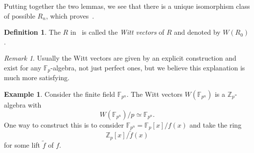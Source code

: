 \documentclass[10pt, oneside]{memoir}
\theoremstyle{definition}
\newtheorem{defn}[thm]{Definition}
\newtheorem{exm}[thm]{Example}
\theoremstyle{remark}
\newtheorem{rmk}[thm]{Remark}
\theoremstyle{plain}
\theoremstyle{definition}
\theoremstyle{remark}
\newcommand{\Z}{\mathbb{Z}}
\newcommand{\F}{\mathbb{F}}
\newcommand{\1}{\mathbf{1}}
\newcommand{\2}{\mathbf{2}}
\newcommand{\3}{\mathbf{3}}
\begin{document}
Putting together the two lemmas, we see that there is a unique isomorphism class of possible $R_n$, which proves~.

\begin{defn}
    The $R$ in~ is called the \textit{Witt vectors} of $R$ and denoted by $W(R_0)$.
\end{defn}

\begin{rmk}
    Usually the Witt vectors are given by an explicit construction and exist for any $\F_p$-algebra, not just perfect ones, but we believe this explanation is much more satisfying.
\end{rmk}

\begin{exm}
    Consider the finite field $\F_{p^n}$. The Witt vectors $W(\F_{p^n})$
    is a $\Z_p$-algebra with 
    \[ W(\F_{p^n}) / p \simeq \F_{p^n}. \] 
    One way to construct this is to consider $\F_{p^n} = \F_p[x]/f(x)$ and take the ring
    \[ \Z_p[x]/\tilde{f}(x) \]
    for some lift $\tilde{f}$ of $f$.
\end{exm}
\end{document}
